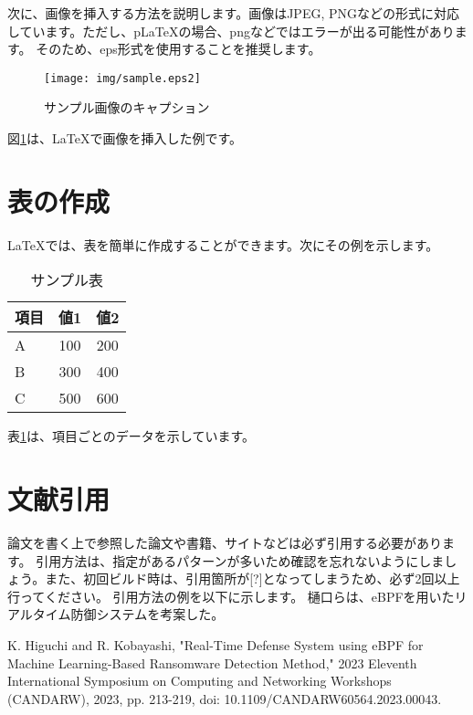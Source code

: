 \documentclass[a4paper,12pt]{article}
\begin{document}
次に、画像を挿入する方法を説明します。画像はJPEG, PNGなどの形式に対応しています。ただし、pLaTeXの場合、pngなどではエラーが出る可能性があります。
そのため、eps形式を使用することを推奨します。

\begin{figure}[h]
    \centering
    \texttt{[image: img/sample.eps2]}
    \caption{サンプル画像のキャプション}
    \label{fig:sample}
\end{figure}

図\ref{fig:sample}は、LaTeXで画像を挿入した例です。

\section{表の作成}

LaTeXでは、表を簡単に作成することができます。次にその例を示します。

\begin{table}[h]
    \centering
    \begin{tabular}{lcc}
        \toprule
        項目 & 値1 & 値2 \\
        \midrule
        A & 100 & 200 \\
        B & 300 & 400 \\
        C & 500 & 600 \\
        \bottomrule
    \end{tabular}
    \caption{サンプル表}
    \label{tab:sample}
\end{table}

表\ref{tab:sample}は、項目ごとのデータを示しています。

\section{文献引用}
論文を書く上で参照した論文や書籍、サイトなどは必ず引用する必要があります。
引用方法は、指定があるパターンが多いため確認を忘れないようにしましょう。また、初回ビルド時は、引用箇所が[?]となってしまうため、必ず2回以上行ってください。
引用方法の例を以下に示します。
樋口らは、eBPFを用いたリアルタイム防御システムを考案した\cite{Higuchi2023}。

\begin{thebibliography}{1}
K. Higuchi and R. Kobayashi, "Real-Time Defense System using eBPF for Machine Learning-Based Ransomware Detection Method," 2023 Eleventh International Symposium on Computing and Networking Workshops (CANDARW), 2023, pp. 213-219, doi: 10.1109/CANDARW60564.2023.00043. 
\end{thebibliography}
\end{document}
